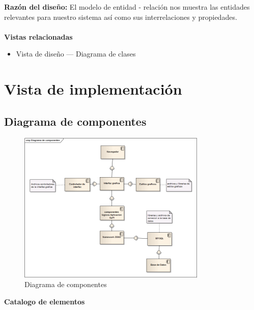 \documentclass[12pt,oneside,letterpaper]{report}
\begin{document}
\textbf{Razón del diseño:}
El modelo de entidad - relación nos muestra las entidades relevantes para nuestro sistema así como sus  interrelaciones y propiedades.\\
\\

\textbf{Vistas relacionadas}
\begin{itemize}
\item Vista de diseño --- Diagrama de clases
\end{itemize}

\section{Vista de implementación}

\subsection{Diagrama de componentes}

\begin{figure}[h!]
  \centering
    \includegraphics[width=0.80\textwidth]{./img/img9.png}
  \caption{Diagrama de componentes}
\end{figure}


\textbf{Catalogo de elementos}\\
\end{document}
